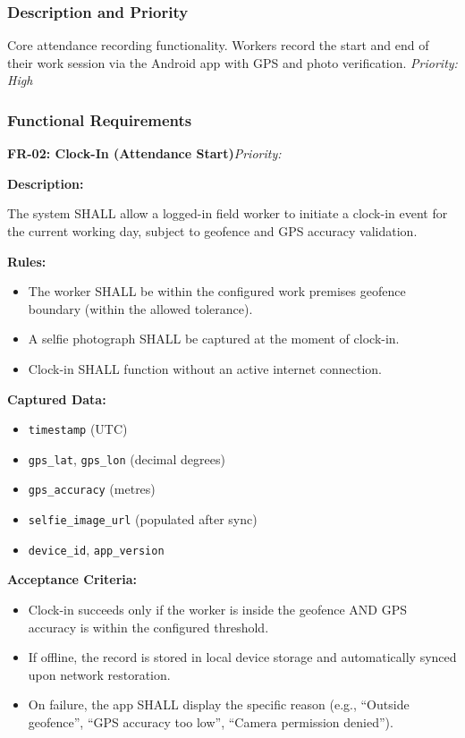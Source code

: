 \documentclass[12pt, a4paper]{article}
\newcommand{\frblock}[2]{%
    \noindent\textbf{#1}\hfill\textit{Priority: #2}%
    \par\smallskip%
}
\newcommand{\srsfield}[1]{\noindent\textbf{#1:}\par}
\begin{document}
\subsubsection*{Description and Priority}
Core attendance recording functionality. Workers record the start and end
of their work session via the Android app with GPS and photo verification.
\hfill \textit{Priority: High}

\subsubsection*{Functional Requirements}

\frblock{FR-02: Clock-In (Attendance Start)}{}

\srsfield{Description}
The system SHALL allow a logged-in field worker to initiate a clock-in
event for the current working day, subject to geofence and GPS accuracy
validation.

\srsfield{Rules}
\begin{itemize}
    \item The worker SHALL be within the configured work premises geofence
          boundary (within the allowed tolerance).
    \item A selfie photograph SHALL be captured at the moment of clock-in.
    \item Clock-in SHALL function without an active internet connection.
\end{itemize}

\srsfield{Captured Data}
\begin{itemize}
    \item \texttt{timestamp} (UTC)
    \item \texttt{gps\_lat}, \texttt{gps\_lon} (decimal degrees)
    \item \texttt{gps\_accuracy} (metres)
    \item \texttt{selfie\_image\_url} (populated after sync)
    \item \texttt{device\_id}, \texttt{app\_version}
\end{itemize}

\srsfield{Acceptance Criteria}
\begin{itemize}
    \item Clock-in succeeds only if the worker is inside the geofence
          AND GPS accuracy is within the configured threshold.
    \item If offline, the record is stored in local device storage and
          automatically synced upon network restoration.
    \item On failure, the app SHALL display the specific reason
          (e.g., ``Outside geofence'', ``GPS accuracy too low'',
          ``Camera permission denied'').
\end{itemize}
\end{document}
